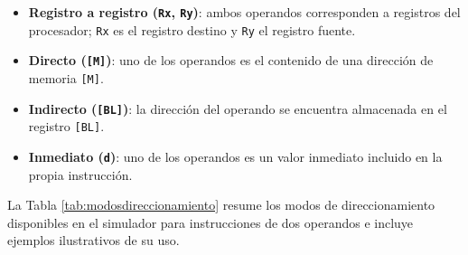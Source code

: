 \documentclass[12pt,oneside]{templates/unerthesis}
\providecommand{\tightlist}{%
  \setlength{\itemsep}{0pt}\setlength{\parskip}{0pt}}
\begin{document}
\begin{itemize}
\tightlist
\item
  \textbf{Registro a registro (\texttt{Rx}, \texttt{Ry})}: ambos operandos corresponden a registros del procesador; \texttt{Rx} es el registro destino y \texttt{Ry} el registro fuente.
\item
  \textbf{Directo (\texttt{{[}M{]}})}: uno de los operandos es el contenido de una dirección de memoria \texttt{{[}M{]}}.
\item
  \textbf{Indirecto (\texttt{{[}BL{]}})}: la dirección del operando se encuentra almacenada en el registro \texttt{{[}BL{]}}.
\item
  \textbf{Inmediato (\texttt{d})}: uno de los operandos es un valor inmediato incluido en la propia instrucción.
\end{itemize}

La Tabla \ref{tab:modosdireccionamiento} resume los modos de direccionamiento disponibles en el simulador para instrucciones de dos operandos e incluye ejemplos ilustrativos de su uso.
\end{document}
